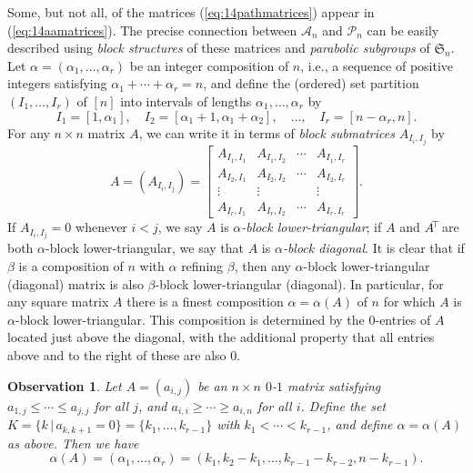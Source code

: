 \documentclass[12pt]{amsart}
\newtheorem{obs}[thm]{Observation}
\theoremstyle{definition}
\numberwithin{equation}{section}
\newcommand{\sn}{\mathfrak{S}_n}
\newcommand{\tr}{{\negthickspace \top \negthickspace}}
\begin{document}
Some, but not all, of the matrices (\ref{eq:14pathmatrices})
appear in
(\ref{eq:14aamatrices}).
The precise connection between $\mathcal A_n$
and $\mathcal P_n$
can be easily described using \emph{block structures} of these matrices
and {\em parabolic subgroups} of $\sn$.
Let $\alpha = (\alpha_1,\dotsc,\alpha_r)$
be an integer composition of $n$,
i.e., a sequence of positive integers satisfying
$\alpha_1 + \cdots + \alpha_r = n$, and define the (ordered) set partition
$(I_1, \dotsc, I_r)$ of $[n]$
 into intervals
 of lengths $\alpha_1,\dotsc,\alpha_r$ by
\begin{equation}\label{eq:alphaintervals}
  I_1 = [1,\alpha_1], \quad I_2 = [\alpha_1+1,\alpha_1+\alpha_2],\quad \dotsc, \quad
  I_r = [n-\alpha_r, n].
\end{equation}
For any $n\times n$ matrix $A$, we can write it in terms of \emph{block submatrices} $A_{I_i, I_j}$ by
\begin{equation}\label{eq:block}
  A = (A_{I_i,I_j}) =
  \begin{bmatrix}
    A_{I_1, I_1} & A_{I_1,I_2} & \cdots & A_{I_1,I_r} \\
    A_{I_2, I_1} & A_{I_2,I_2} & \cdots & A_{I_2,I_r} \\
    \vdots     & \vdots    &        & \vdots   \\
    A_{I_r, I_1} & A_{I_r,I_2} & \cdots & A_{I_r,I_r}
  \end{bmatrix}.
\end{equation}
If $A_{I_i, I_j} =0$ whenever $i<j$, we say $A$ is
{\em $\alpha$-block lower-triangular};
if $A$ and $A^\tr$ are both
$\alpha$-block lower-triangular, we say that $A$ is
{\em $\alpha$-block diagonal}.
It is clear that if $\beta$ is a composition of $n$ with
$\alpha$ refining $\beta$, then
any $\alpha$-block lower-triangular (diagonal) matrix
is also $\beta$-block lower-triangular (diagonal).
In particular, for any square matrix $A$ there is a
finest composition $\alpha = \alpha(A)$ of $n$ for which $A$ is $\alpha$-block
lower-triangular.
This composition is determined by the $0$-entries of $A$ located
just above the diagonal, with the additional property that all entries above
and to the right of these are also $0$.
\begin{obs}\label{eq:superdiagonal0}
  Let $A= (a_{i,j})$ be an $n \times n$ $0$-$1$ matrix
  satisfying $a_{1,j} \leq \cdots \leq a_{j,j}$ for all $j$,
  and $a_{i,i} \geq \cdots \geq a_{i,n}$ for all $i$.
  Define the set
  $K = \{ k \,|\, a_{k,k+1} = 0 \} = \{k_1,\dotsc,k_{r-1}\}$
  with $k_1 < \cdots < k_{r-1}$, and define $\alpha = \alpha(A)$ as above.
  Then we have
\begin{equation}\label{eq:alphaK}
  \alpha(A) = (\alpha_1,\dotsc,\alpha_r) =
  (k_1, k_2 - k_1, \dotsc, k_{r-1} - k_{r-2}, n - k_{r-1}).
\end{equation}
\end{obs}
\end{document}
